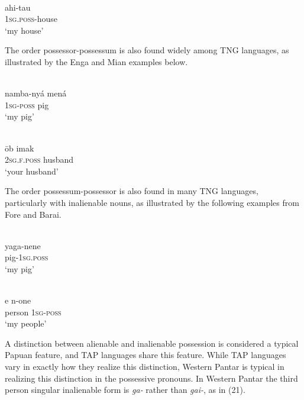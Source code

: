 \ea%
 \\
\gll  ahi-tau \\
 \textsc{1sg.poss}-house  \\
\glt `my house'
\z





The order possessor-possessum is also found widely among TNG languages, as illustrated by the Enga and Mian examples below.

\ea%
 \\
\gll  namba-ny\'a men\'a \\
 \textsc{1sg-poss} pig  \\
\glt `my pig'
\z





\ea%
 \\
\gll  \=ob imak \\
   \textsc{2sg.f.poss} husband\\
\glt `your husband'
\z





The order possessum-possessor is also found in many TNG languages, particularly with inalienable nouns, as illustrated by the following examples from Fore and Barai.


\ea%
 \\
\gll  yaga-nene \\
   pig-\textsc{1sg.poss} \\
\glt `my pig'
\z





\ea%
 \\
\gll  e n-one \\
   person \textsc{1sg-poss} \\
\glt `my people'
\z





A distinction between alienable and inalienable possession is considered a typical Papuan feature, and TAP languages share this feature. While TAP languages vary in exactly how they realize this distinction, Western Pantar is typical in realizing this distinction in the possessive pronouns. In Western Pantar the third person singular inalienable form is \textit{ga-} rather than \textit{gai-}, as in (21).

